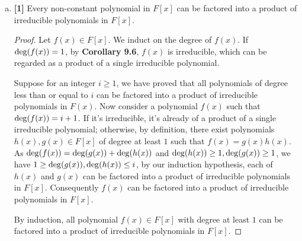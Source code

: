 \documentclass[12pt,letterpaper]{article}
\newcommand{\pnt}[1]{\textbf{[#1]}}
\newcommand{\lparen}[1]{\large(#1\large)}
\begin{document}
\begin{enumerate}[(a)]
        \item \pnt{1} Every non-constant polynomial in $F[x]$ can be factored into a product of irreducible polynomials in $F[x]$.
        
        \begin{proof}
        	Let $f(x)\in F[x]$. We induct on the degree of $f(x)$. If $\deg\lparen{f(x)}=1$, by \textbf{Corollary 9.6}, $f(x)$ is irreducible, which can be regarded as a product of a single irreducible polynomial.
        	
        	Suppose for an integer $i\ge 1$, we have proved that all polynomials of degree less than or equal to $i$ can be factored into a product of irreducible polynomials in $F(x)$. Now consider a polynomial $f(x)$ such that $\deg\lparen{f(x)}=i+1$. If it's irreducible, it's already of a product of a single irreducible polynomial; otherwise, by definition, there exist polynomials $h(x), g(x)\in F[x]$ of degree at least $1$  such that $f(x)=g(x)h(x)$. As $\deg\lparen{f(x)}=\deg\lparen{g(x)}+\deg\lparen{h(x)}$ and $\deg\lparen{h(x)}\ge 1,\deg\lparen{g(x)}\ge 1$, we have $ 1\ge \deg\lparen{g(x)},\deg\lparen{h(x)} \le i$, by our induction hypothesis, each of $h(x)$ and $g(x)$ can be factored into a product of irreducible polynomials in $F[x]$. Consequently $f(x)$ can be factored into a product of irreducible polynomials in $F[x]$.
        	
        	By induction, all polynomial $f(x)\in F[x]$ with degree at least $1$ can be factored into a product of irreducible polynomials in $F[x]$. 
        \end{proof}

    \end{enumerate}

\vspace{5pt}
\end{document}
